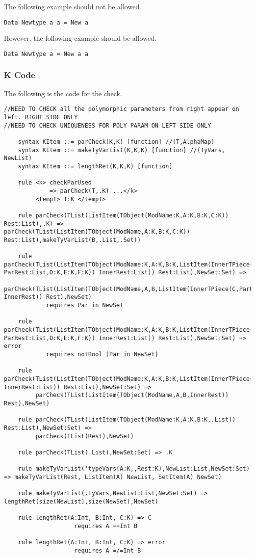 The following example should not be allowed.
\begin{lstlisting}
Data Newtype a a = New a
\end{lstlisting}

However, the following example should be allowed.
\begin{lstlisting}
Data Newtype a = New a a
\end{lstlisting}

\subsubsection{K Code}
The following is the code for the check.

\begin{lstlisting}
//NEED TO CHECK all the polymorphic parameters from right appear on left. RIGHT SIDE ONLY
//NEED TO CHECK UNIQUENESS FOR POLY PARAM ON LEFT SIDE ONLY

    syntax KItem ::= parCheck(K,K) [function] //(T,AlphaMap)
    syntax KItem ::= makeTyVarList(K,K,K) [function] //(TyVars, NewList)
    syntax KItem ::= lengthRet(K,K,K) [function]

    rule <k> checkParUsed
             => parCheck(T,.K) ...</k>
         <tempT> T:K </tempT>

    rule parCheck(TList(ListItem(TObject(ModName:K,A:K,B:K,C:K)) Rest:List),.K) => parCheck(TList(ListItem(TObject(ModName,A:K,B:K,C:K)) Rest:List),makeTyVarList(B,.List,.Set))

    rule parCheck(TList(ListItem(TObject(ModName:K,A:K,B:K,ListItem(InnerTPiece(C:K,ListItem(Par:KItem) ParRest:List,D:K,E:K,F:K)) InnerRest:List)) Rest:List),NewSet:Set) =>
         parCheck(TList(ListItem(TObject(ModName,A,B,ListItem(InnerTPiece(C,ParRest,D,E,F)) InnerRest)) Rest),NewSet)
            requires Par in NewSet

    rule parCheck(TList(ListItem(TObject(ModName:K,A:K,B:K,ListItem(InnerTPiece(C:K,ListItem(Par:KItem) ParRest:List,D:K,E:K,F:K)) InnerRest:List)) Rest:List),NewSet:Set) => error
            requires notBool (Par in NewSet)

    rule parCheck(TList(ListItem(TObject(ModName:K,A:K,B:K,ListItem(InnerTPiece(C:K,.List,D:K,E:K,F:K)) InnerRest:List)) Rest:List),NewSet:Set) =>
         parCheck(TList(ListItem(TObject(ModName,A,B,InnerRest)) Rest),NewSet)

    rule parCheck(TList(ListItem(TObject(ModName:K,A:K,B:K,.List)) Rest:List),NewSet:Set) =>
         parCheck(TList(Rest),NewSet)

    rule parCheck(TList(.List),NewSet:Set) => .K

    rule makeTyVarList('typeVars(A:K,,Rest:K),NewList:List,NewSet:Set) => makeTyVarList(Rest, ListItem(A) NewList, SetItem(A) NewSet)

    rule makeTyVarList(.TyVars,NewList:List,NewSet:Set) => lengthRet(size(NewList),size(NewSet),NewSet)

    rule lengthRet(A:Int, B:Int, C:K) => C
                    requires A ==Int B

    rule lengthRet(A:Int, B:Int, C:K) => error
                    requires A =/=Int B
\end{lstlisting}